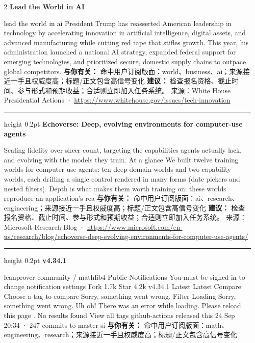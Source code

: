 \documentclass[10.5pt]{ctexart}
\begin{document}
\begin{multicols}{2}
{\large\bfseries Lead the World in AI}\par
lead the world in ai President Trump has reasserted American leadership in technology by accelerating innovation in artificial intelligence, digital assets, and advanced manufacturing while cutting red tape that stifles growth. This year, his administration launched a national AI strategy, expanded federal support for emerging technologies, and prioritized secure, domestic supply chains to outpace global competitors.
\textbf{与你有关：} 命中用户订阅版面：world、business、ai；来源接近一手且权威度高；标题/正文包含高信号变化
\textbf{建议：} 检查报名资格、截止时间、参与形式和预期收益；合适则立即加入任务系统。
{\footnotesize\color{ormuted} 来源：White House Presidential Actions · \url{https://www.whitehouse.gov/issues/tech-innovation}}
\vspace{2mm}
\hrule height 0.2pt
\vspace{2mm}
{\large\bfseries Echoverse: Deep, evolving environments for computer-use agents}\par
Scaling fidelity over sheer count, targeting the capabilities agents actually lack, and evolving with the models they train. At a glance We built twelve training worlds for computer-use agents: ten deep domain worlds and two capability worlds, each drilling a single control rendered in many forms (date pickers and nested filters). Depth is what makes them worth training on: these worlds reproduce an application’s rea
\textbf{与你有关：} 命中用户订阅版面：ai、research、engineering；来源接近一手且权威度高；标题/正文包含高信号变化
\textbf{建议：} 检查报名资格、截止时间、参与形式和预期收益；合适则立即加入任务系统。
{\footnotesize\color{ormuted} 来源：Microsoft Research Blog · \url{https://www.microsoft.com/en-us/research/blog/echoverse-deep-evolving-environments-for-computer-use-agents/}}
\vspace{2mm}
\hrule height 0.2pt
\vspace{2mm}
{\large\bfseries v4.34.1}\par
leanprover-community / mathlib4 Public Notifications You must be signed in to change notification settings Fork 1.7k Star 4.2k v4.34.1 Latest Latest Compare Choose a tag to compare Sorry, something went wrong. Filter Loading Sorry, something went wrong. Uh oh! There was an error while loading. Please reload this page . No results found View all tags github-actions released this 24 Sep 20:34 · 247 commits to master si
\textbf{与你有关：} 命中用户订阅版面：math、engineering、research；来源接近一手且权威度高；标题/正文包含高信号变化

\end{multicols}
\end{document}

